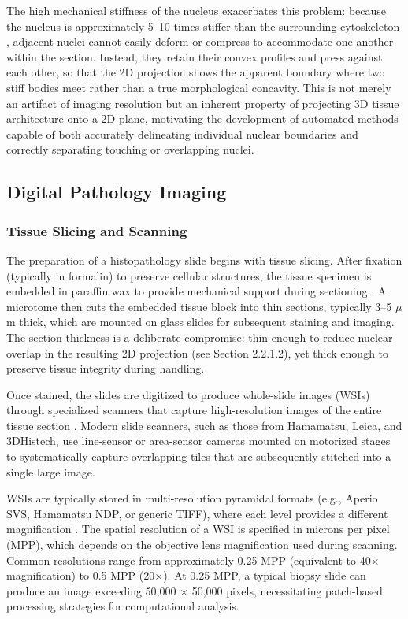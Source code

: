 The high mechanical stiffness of the nucleus exacerbates this problem: because the nucleus is approximately 5--10 times stiffer than the surrounding cytoskeleton \cite{lammerding2011mechanics}, adjacent nuclei cannot easily deform or compress to accommodate one another within the section. Instead, they retain their convex profiles and press against each other, so that the 2D projection shows the apparent boundary where two stiff bodies meet rather than a true morphological concavity. This is not merely an artifact of imaging resolution but an inherent property of projecting 3D tissue architecture onto a 2D plane, motivating the development of automated methods capable of both accurately delineating individual nuclear boundaries and correctly separating touching or overlapping nuclei.

\subsection{Digital Pathology Imaging}

\subsubsection{Tissue Slicing and Scanning}

The preparation of a histopathology slide begins with tissue slicing. After fixation (typically in formalin) to preserve cellular structures, the tissue specimen is embedded in paraffin wax to provide mechanical support during sectioning \cite{feldman2014he}. A microtome then cuts the embedded tissue block into thin sections, typically 3--5 $\mu$m thick, which are mounted on glass slides for subsequent staining and imaging. The section thickness is a deliberate compromise: thin enough to reduce nuclear overlap in the resulting 2D projection (see Section 2.2.1.2), yet thick enough to preserve tissue integrity during handling.

Once stained, the slides are digitized to produce whole-slide images (WSIs) through specialized scanners that capture high-resolution images of the entire tissue section \cite{hanna2020wsi}. Modern slide scanners, such as those from Hamamatsu, Leica, and 3DHistech, use line-sensor or area-sensor cameras mounted on motorized stages to systematically capture overlapping tiles that are subsequently stitched into a single large image.

WSIs are typically stored in multi-resolution pyramidal formats (e.g., Aperio SVS, Hamamatsu NDP, or generic TIFF), where each level provides a different magnification \cite{hanna2020wsi}. The spatial resolution of a WSI is specified in microns per pixel (MPP), which depends on the objective lens magnification used during scanning. Common resolutions range from approximately 0.25 MPP (equivalent to 40$\times$ magnification) to 0.5 MPP (20$\times$). At 0.25 MPP, a typical biopsy slide can produce an image exceeding 50,000 $\times$ 50,000 pixels, necessitating patch-based processing strategies for computational analysis.

